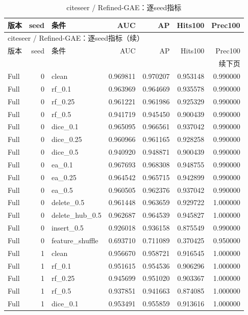 \documentclass[UTF8,a4paper,11pt,fontset=fandol]{ctexart}
\begin{document}
{\footnotesize
\setlength{\tabcolsep}{3pt}
\begin{longtable}{lrlrrrr}
\caption{citeseer / Refined-GAE：逐seed指标}\\
\toprule
版本 & seed & 条件 & AUC & AP & Hits100 & Prec100 \\
\midrule
\endfirsthead
\multicolumn{7}{l}{citeseer / Refined-GAE：逐seed指标（续）}\\
\toprule
版本 & seed & 条件 & AUC & AP & Hits100 & Prec100 \\
\midrule
\endhead
\midrule\multicolumn{7}{r}{续下页}\\
\endfoot
\bottomrule\endlastfoot
Full & 0 & clean & 0.969811 & 0.970207 & 0.953148 & 0.990000 \\
Full & 0 & rf\_0.1 & 0.963969 & 0.964669 & 0.935578 & 0.990000 \\
Full & 0 & rf\_0.25 & 0.961221 & 0.961986 & 0.925329 & 0.990000 \\
Full & 0 & rf\_0.5 & 0.941719 & 0.945450 & 0.900439 & 0.990000 \\
Full & 0 & dice\_0.1 & 0.965095 & 0.966561 & 0.937042 & 0.990000 \\
Full & 0 & dice\_0.25 & 0.960966 & 0.961165 & 0.928258 & 0.990000 \\
Full & 0 & dice\_0.5 & 0.940920 & 0.948871 & 0.900439 & 0.990000 \\
Full & 0 & ea\_0.1 & 0.967693 & 0.968308 & 0.948755 & 0.990000 \\
Full & 0 & ea\_0.25 & 0.964542 & 0.965715 & 0.942899 & 0.990000 \\
Full & 0 & ea\_0.5 & 0.960505 & 0.962376 & 0.937042 & 0.990000 \\
Full & 0 & delete\_0.5 & 0.961448 & 0.963659 & 0.929722 & 1.000000 \\
Full & 0 & delete\_hub\_0.5 & 0.962687 & 0.964539 & 0.945827 & 1.000000 \\
Full & 0 & insert\_0.5 & 0.926018 & 0.936158 & 0.875549 & 0.990000 \\
Full & 0 & feature\_shuffle & 0.693710 & 0.711089 & 0.370425 & 0.950000 \\
Full & 1 & clean & 0.956670 & 0.958721 & 0.916545 & 1.000000 \\
Full & 1 & rf\_0.1 & 0.951615 & 0.954536 & 0.906296 & 1.000000 \\
Full & 1 & rf\_0.25 & 0.945699 & 0.951020 & 0.903367 & 1.000000 \\
Full & 1 & rf\_0.5 & 0.937851 & 0.941663 & 0.874085 & 1.000000 \\
Full & 1 & dice\_0.1 & 0.953491 & 0.955859 & 0.913616 & 1.000000 \\

\end{longtable}}
\end{document}
